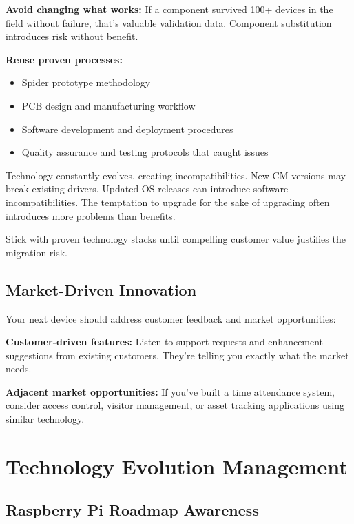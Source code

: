 \textbf{Avoid changing what works:}
If a component survived 100+ devices in the field without failure, that's valuable validation data. Component substitution introduces risk without benefit.

\textbf{Reuse proven processes:}
\begin{itemize}
\item Spider prototype methodology
\item PCB design and manufacturing workflow
\item Software development and deployment procedures
\item Quality assurance and testing protocols that caught issues
\end{itemize}

\begin{tcolorbox}[colback=red!10,colframe=red!75!black,title=Evolution vs. Stability Trade-off]
Technology constantly evolves, creating incompatibilities. New CM versions may break existing drivers. Updated OS releases can introduce software incompatibilities. The temptation to upgrade for the sake of upgrading often introduces more problems than benefits.

Stick with proven technology stacks until compelling customer value justifies the migration risk.
\end{tcolorbox}

\subsection{Market-Driven Innovation}

Your next device should address customer feedback and market opportunities:

\textbf{Customer-driven features:}
Listen to support requests and enhancement suggestions from existing customers. They're telling you exactly what the market needs.

\textbf{Adjacent market opportunities:}
If you've built a time attendance system, consider access control, visitor management, or asset tracking applications using similar technology.

\section{Technology Evolution Management}

\subsection{Raspberry Pi Roadmap Awareness}

